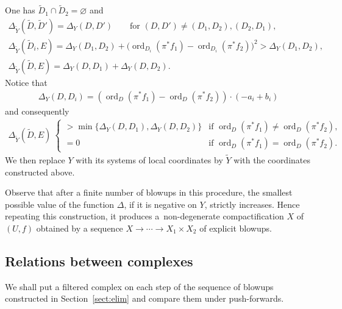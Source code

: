 \documentclass[11pt]{article}
\newcommand{\cpt}{compactification}
\newcommand{\ord}{\operatorname{ord}}
\begin{document}
One has $\widetilde{D}_1\cap\widetilde{D}_2 = \varnothing$ and
\begin{gather*}
\Delta_{\widetilde{Y}}(\widetilde{D},\widetilde{D}') = \Delta_Y(D,D') \qquad \text{for $(D,D') \neq (D_1,D_2), (D_2,D_1)$}, \\
\Delta_{\widetilde{Y}}(\widetilde{D}_i,E) = \Delta_Y(D_1,D_2) + \big(\ord_{D_i}(\pi^*f_1)-\ord_{D_i}(\pi^*f_2)\big)^2	> \Delta_Y(D_1,D_2), \\
\Delta_{\widetilde{Y}}(\widetilde{D},E)= \Delta_Y(D,D_1) + \Delta_Y(D,D_2).
\end{gather*}
Notice that
\begin{gather*} \Delta_Y(D,D_i) = \left(\ord_D(\pi^*f_1) -\ord_D(\pi^*f_2)\right)\cdot (-a_i+b_i) \end{gather*}
and consequently
\begin{gather*} \Delta_{\widetilde{Y}}(\widetilde{D},E) \ \begin{cases}
> \min\{\Delta_Y(D,D_1),\Delta_Y(D,D_2)\} & \text{if $\ord_D(\pi^*f_1) \neq \ord_D(\pi^*f_2)$}, \\
= 0 & \text{if $\ord_D(\pi^*f_1) = \ord_D(\pi^*f_2)$}.
\end{cases} \end{gather*}
We then replace $Y$ with its systems of local coordinates by $\widetilde{Y}$ with the coordinates constructed above.

Observe that after a finite number of blowups in this procedure, the smallest possible value of the function $\Delta$, if it is negative on $Y$, strictly increases. Hence repeating this construction, it produces a~non-degenerate {\cpt} $X$ of $(U,f)$ obtained by a sequence $X \to\cdots\to X_1\times X_2$ of explicit blowups.

\subsection{Relations between complexes}\label{sect:relations}
We shall put a filtered complex on each step of the sequence of blowups constructed in Section~\ref{sect:elim} and compare them under push-forwards.
\end{document}
